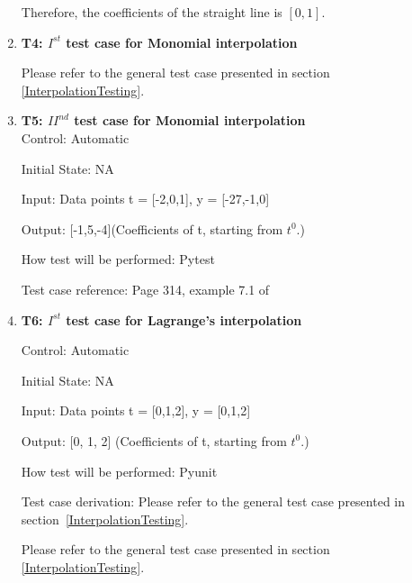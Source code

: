 \documentclass[12pt, titlepage]{article}
\begin{document}
\begin{enumerate}
{\begin{varwidth}{\textwidth}
Therefore, the coefficients of the straight line is $[0,1]$.




\end{varwidth} }






\item{\textbf{T4: $I^{st}$ test case for Monomial interpolation} \\}

Please refer to the general test case presented in section 
\ref{InterpolationTesting}.


\item{\textbf{T5: ${II}^{nd}$ test case for Monomial interpolation}}\\

Control: Automatic
					
Initial State: NA
					
Input: Data points t = [-2,0,1], y = [-27,-1,0]

Output: [-1,5,-4](Coefficients of t, starting from $t^{0}$.)

How test will be performed: Pytest

Test case reference: Page 314, example 7.1 of ~\cite{Health1997}\\


					
\item{\textbf{T6: $I^{st}$ test case for Lagrange's interpolation} \\}

Control: Automatic

Initial State: NA
 
Input: Data points t = [0,1,2], y = [0,1,2]
 
Output: [0, 1, 2] (Coefficients of t, starting from $t^{0}$.)

How test will be performed: Pyunit

Test case derivation: Please refer to the general test case presented in 
section~\ref{InterpolationTesting}.

   
Please refer to the general test case presented in section 
\ref{InterpolationTesting}.


\end{enumerate}
\end{document}

